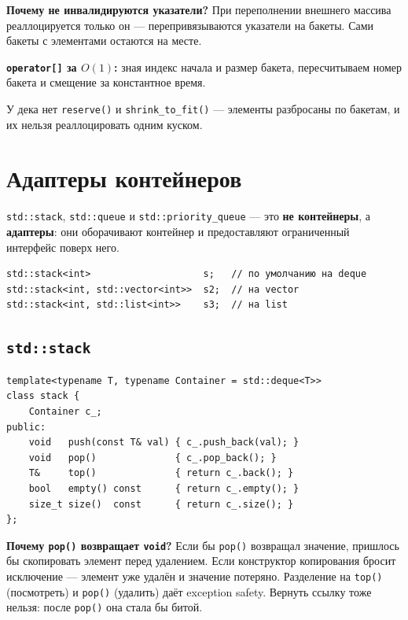 \documentclass[a4paper,12pt]{article}
\begin{document}
\textbf{Почему не инвалидируются указатели?} При переполнении внешнего
массива реаллоцируется только он --- перепривязываются указатели на бакеты.
Сами бакеты с элементами остаются на месте.

\textbf{\texttt{operator[]} за $O(1)$:} зная индекс начала и размер бакета,
пересчитываем номер бакета и смещение за константное время.

\medskip
У дека нет \texttt{reserve()} и \texttt{shrink\_to\_fit()} --- элементы
разбросаны по бакетам, и их нельзя реаллоцировать одним куском.

\section{Адаптеры контейнеров}

\texttt{std::stack}, \texttt{std::queue} и \texttt{std::priority\_queue}
--- это \textbf{не контейнеры}, а \textbf{адаптеры}: они оборачивают
контейнер и предоставляют ограниченный интерфейс поверх него.

\begin{lstlisting}
std::stack<int>                    s;   // по умолчанию на deque
std::stack<int, std::vector<int>>  s2;  // на vector
std::stack<int, std::list<int>>    s3;  // на list
\end{lstlisting}

\subsection{\texttt{std::stack}}

\begin{lstlisting}
template<typename T, typename Container = std::deque<T>>
class stack {
    Container c_;
public:
    void   push(const T& val) { c_.push_back(val); }
    void   pop()              { c_.pop_back(); }
    T&     top()              { return c_.back(); }
    bool   empty() const      { return c_.empty(); }
    size_t size()  const      { return c_.size(); }
};
\end{lstlisting}

\textbf{Почему \texttt{pop()} возвращает \texttt{void}?}
Если бы \texttt{pop()} возвращал значение, пришлось бы скопировать
элемент перед удалением. Если конструктор копирования бросит исключение
--- элемент уже удалён и значение потеряно. Разделение на \texttt{top()}
(посмотреть) и \texttt{pop()} (удалить) даёт exception safety.
Вернуть ссылку тоже нельзя: после \texttt{pop()} она стала бы битой.
\end{document}
